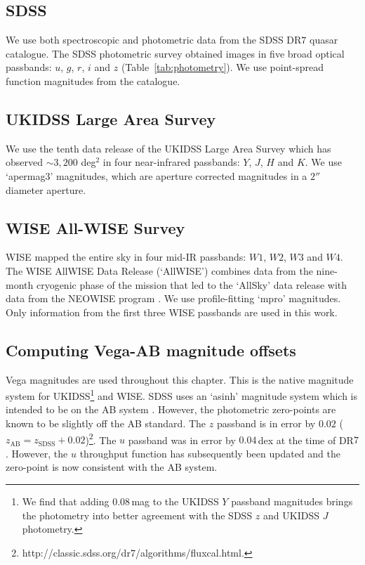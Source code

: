 \subsection{SDSS}

We use both spectroscopic and photometric data from the SDSS DR$7$ quasar catalogue.
The SDSS photometric survey obtained images in five broad optical passbands: $u$, $g$, $r$, $i$ and $z$ (Table~\ref{tab:photometry}).
We use point-spread function magnitudes from the catalogue.

\subsection{UKIDSS Large Area Survey}

We use the tenth data release of the UKIDSS Large Area Survey which has observed $\sim 3,200$ deg$^2$ in four near-infrared passbands: $Y$, $J$, $H$ and $K$.
We use `apermag$3$' magnitudes, which are aperture corrected magnitudes in a $2''$ diameter aperture.

\subsection{WISE All-WISE Survey}

WISE mapped the entire sky in four mid-IR passbands: $W1$, $W2$, $W3$ and $W4$.
The WISE AllWISE Data Release (`AllWISE') combines data from the nine-month cryogenic phase of the mission that led to the `AllSky' data release with data from the NEOWISE program \citep{mainzer11}.
We use profile-fitting `mpro' magnitudes.
Only information from the first three WISE passbands are used in this work.

\subsection{Computing Vega-AB magnitude offsets}

Vega magnitudes are used throughout this chapter.
This is the native magnitude system for UKIDSS\footnote{We find that adding $0.08$\,mag to the UKIDSS $Y$ passband magnitudes brings the photometry into better agreement with the SDSS $z$ and UKIDSS $J$ photometry.} and WISE.
SDSS uses an `asinh' magnitude system \citep{lupton99} which is intended to be on the AB system \citep{oke83}.
However, the photometric zero-points are known to be slightly off the AB standard.
The $z$ passband is in error by $0.02$ ($z_{\text{AB}} = z_{\text{SDSS}} + 0.02$)\footnote{http://classic.sdss.org/dr$7$/algorithms/fluxcal.html.}.
The $u$ passband was in error by $0.04$\,dex at the time of DR$7$.
However, the $u$ throughput function has subsequently been updated \citep{doi10} and the zero-point is now consistent with the AB system.

